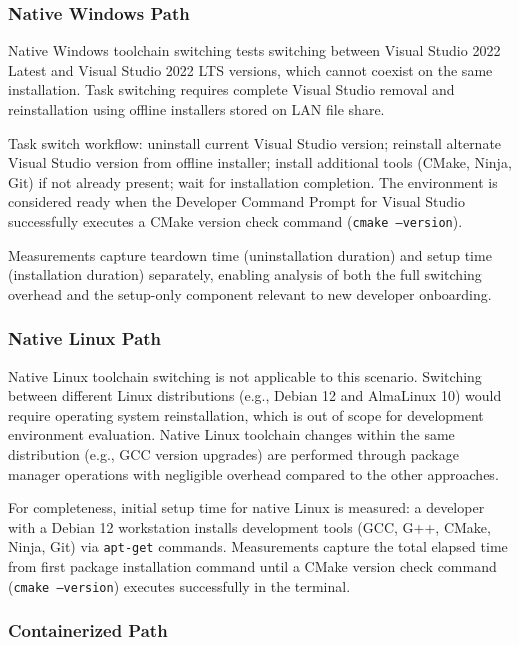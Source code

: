 \subsubsection{Native Windows Path}

Native Windows toolchain switching tests switching between Visual Studio 2022 Latest and Visual Studio 2022 LTS versions, which cannot coexist on the same installation.
Task switching requires complete Visual Studio removal and reinstallation using offline installers stored on LAN file share.

Task switch workflow: uninstall current Visual Studio version; reinstall alternate Visual Studio version from offline installer; install additional tools (CMake, Ninja, Git) if not already present; wait for installation completion.
The environment is considered ready when the Developer Command Prompt for Visual Studio successfully executes a CMake version check command (\texttt{cmake --version}).

Measurements capture teardown time (uninstallation duration) and setup time (installation duration) separately, enabling analysis of both the full switching overhead and the setup-only component relevant to new developer onboarding.

\subsubsection{Native Linux Path}

Native Linux toolchain switching is not applicable to this scenario.
Switching between different Linux distributions (e.g., Debian 12 and AlmaLinux 10) would require operating system reinstallation, which is out of scope for development environment evaluation.
Native Linux toolchain changes within the same distribution (e.g., GCC version upgrades) are performed through package manager operations with negligible overhead compared to the other approaches.

For completeness, initial setup time for native Linux is measured: a developer with a Debian 12 workstation installs development tools (GCC, G++, CMake, Ninja, Git) via \texttt{apt-get} commands.
Measurements capture the total elapsed time from first package installation command until a CMake version check command (\texttt{cmake --version}) executes successfully in the terminal.

\subsubsection{Containerized Path}

